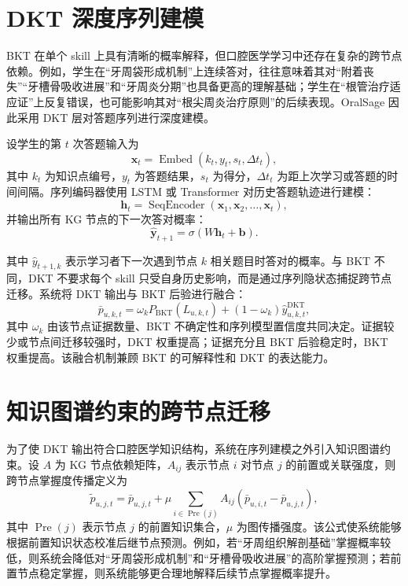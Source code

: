 \section{DKT 深度序列建模}

BKT 在单个 skill 上具有清晰的概率解释，但口腔医学学习中还存在复杂的跨节点依赖。例如，学生在“牙周袋形成机制”上连续答对，往往意味着其对“附着丧失”“牙槽骨吸收进展”和“牙周炎分期”也具备更高的理解基础；学生在“根管治疗适应证”上反复错误，也可能影响其对“根尖周炎治疗原则”的后续表现。OralSage 因此采用 DKT 层对答题序列进行深度建模。

设学生的第 $t$ 次答题输入为
\begin{equation}
  \mathbf{x}_t=
  \operatorname{Embed}(k_t,y_t,s_t,\Delta t_t),
  \label{eq:dkt-input}
\end{equation}
其中 $k_t$ 为知识点编号，$y_t$ 为答题结果，$s_t$ 为得分，$\Delta t_t$ 为距上次学习或答题的时间间隔。序列编码器使用 LSTM 或 Transformer 对历史答题轨迹进行建模：
\begin{equation}
  \mathbf{h}_t=
  \operatorname{SeqEncoder}(\mathbf{x}_1,\mathbf{x}_2,\ldots,\mathbf{x}_t),
  \label{eq:dkt-hidden}
\end{equation}
并输出所有 KG 节点的下一次答对概率：
\begin{equation}
  \hat{\mathbf{y}}_{t+1}=
  \sigma(W\mathbf{h}_t+\mathbf{b}).
  \label{eq:dkt-output}
\end{equation}

其中 $\hat y_{t+1,k}$ 表示学习者下一次遇到节点 $k$ 相关题目时答对的概率。与 BKT 不同，DKT 不要求每个 skill 只受自身历史影响，而是通过序列隐状态捕捉跨节点迁移。系统将 DKT 输出与 BKT 后验进行融合：
\begin{equation}
  \bar p_{u,k,t}=
  \omega_k P_{\mathrm{BKT}}(L_{u,k,t})
  +(1-\omega_k)\hat y_{u,k,t}^{\mathrm{DKT}},
  \label{eq:bkt-dkt-fusion}
\end{equation}
其中 $\omega_k$ 由该节点证据数量、BKT 不确定性和序列模型置信度共同决定。证据较少或节点间迁移较强时，DKT 权重提高；证据充分且 BKT 后验稳定时，BKT 权重提高。该融合机制兼顾 BKT 的可解释性和 DKT 的表达能力。

\section{知识图谱约束的跨节点迁移}

为了使 DKT 输出符合口腔医学知识结构，系统在序列建模之外引入知识图谱约束。设 $A$ 为 KG 节点依赖矩阵，$A_{ij}$ 表示节点 $i$ 对节点 $j$ 的前置或关联强度，则跨节点掌握度传播定义为
\begin{equation}
  \tilde p_{u,j,t}=
  \bar p_{u,j,t}
  +
  \mu
  \sum_{i\in\operatorname{Pre}(j)}
  A_{ij}
  \left(\bar p_{u,i,t}-\bar p_{u,j,t}\right),
  \label{eq:kg-constrained-kt}
\end{equation}
其中 $\operatorname{Pre}(j)$ 表示节点 $j$ 的前置知识集合，$\mu$ 为图传播强度。该公式使系统能够根据前置知识状态校准后继节点预测。例如，若“牙周组织解剖基础”掌握概率较低，则系统会降低对“牙周袋形成机制”和“牙槽骨吸收进展”的高阶掌握预测；若前置节点稳定掌握，则系统能够更合理地解释后续节点掌握概率提升。

